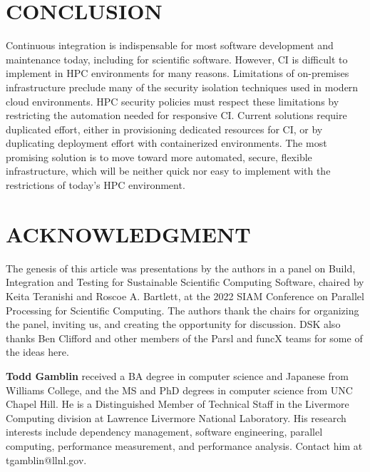 \documentclass{IEEEcsmag}
\begin{document}
\section{CONCLUSION}

Continuous integration is indispensable for most software development and
maintenance today, including for scientific software.
However, CI is difficult to implement in HPC environments for many reasons.
Limitations of on-premises infrastructure preclude many of the security isolation
techniques used in modern cloud environments. HPC security policies must respect these
limitations by restricting the automation needed for responsive CI. Current solutions
require duplicated effort, either in provisioning dedicated resources for CI, or by
duplicating deployment effort with containerized environments. The most promising
solution is to move toward more automated, secure, flexible infrastructure,
which will be
neither quick nor easy to implement with the restrictions of today's HPC environment.

\section{ACKNOWLEDGMENT}

The genesis of this article was presentations by the authors in a panel on Build, Integration and Testing for
Sustainable Scientific Computing Software, chaired by Keita Teranishi and Roscoe A. Bartlett, at the 2022
SIAM Conference on Parallel Processing for Scientific Computing. The authors thank the chairs for organizing
the panel, inviting us, and creating the opportunity for discussion. DSK also thanks Ben Clifford and other
members of the Parsl and funcX teams for some of the ideas here.




\bigskip

\textbf{Todd Gamblin} received a BA degree in computer science and Japanese from Williams College, and the MS and PhD degrees in computer science from UNC Chapel Hill. He is a Distinguished Member of Technical Staff in the Livermore Computing division at Lawrence Livermore National Laboratory. His research interests include dependency management, software engineering, parallel computing, performance measurement, and performance analysis.
Contact him at tgamblin@llnl.gov.
\end{document}
